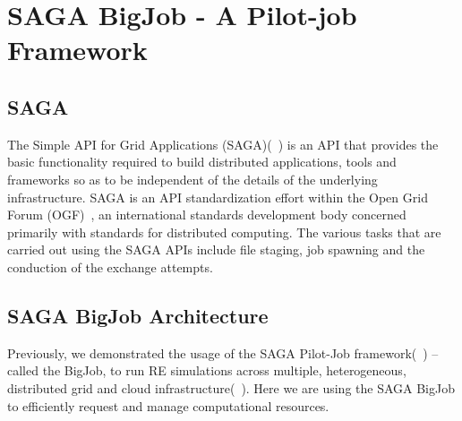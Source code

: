 \documentclass{rspublic}
\newcommand{\alnote}[1]{ {\textcolor{blue} { ***andre: #1 }}}
\newcommand{\athotanote}[1]{ {\textcolor{green} { ***athota: #1 }}}
\newcommand{\alnote}[1]{}
\newcommand{\athotanote}[1]{}
\begin{document}



\section{SAGA BigJob - A Pilot-job Framework}

\subsection{SAGA}
The Simple API for Grid Applications (SAGA)(~\cite{saga_gfd90}) is an API that provides the basic functionality required to build distributed applications, tools and frameworks so as to be independent of the details of the underlying infrastructure. SAGA is an API standardization effort within the Open Grid Forum (OGF)~\cite{ogf_web}, an international standards development body concerned primarily with standards for distributed computing. The various tasks that are carried out using the SAGA APIs include file staging, job spawning and the conduction of the exchange attempts.

\subsection{SAGA BigJob Architecture}
Previously, we demonstrated the usage of the SAGA Pilot-Job framework(~\cite{saga_bigjob_condor_cloud}) -- called the BigJob, to run RE simulations across multiple, heterogeneous, distributed grid and cloud infrastructure(~\cite{Luckow:2008fp}). Here we are using the SAGA BigJob to efficiently request and manage computational resources. 
\end{document}
